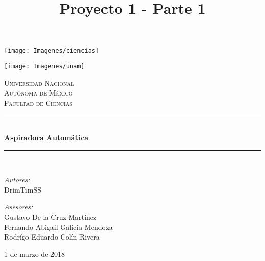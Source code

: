 \documentclass[11pt]{article}
\title{Proyecto 1 - Parte 1}
\newcommand{\HRule}{\rule{\linewidth}{0.5mm}}
\begin{document}

    \begin{center}
        \begin{minipage}{0.48\textwidth} \begin{flushleft}
        \texttt{[image: Imagenes/ciencias]}
        \end{flushleft}\end{minipage}
        \begin{minipage}{0.48\textwidth} \begin{flushright}
        \texttt{[image: Imagenes/unam]}
        \end{flushright}\end{minipage}

        \vspace*{-1.5cm}

        \textsc{\huge Universidad Nacional \\Autónoma de México}\\[1.5cm]

        \textsc{\LARGE Facultad de Ciencias}\\[3cm]

        \vspace*{1.5cm}

        \HRule \\[0.7cm]
        {\huge \bfseries Aspiradora Automática}\\[0.4cm]
        \HRule \\[1.5cm]

        \vfill

        \begin{minipage}{0.46\textwidth}
            \begin{flushleft} \large
                \emph{Autores:}\\
			DrimTimSS
            \end{flushleft}
        \end{minipage}
        \begin{minipage}{0.52\textwidth}
            \vspace{-0.6cm}
            \begin{flushright} \large
                \emph{Asesores:} \\
                Gustavo De la Cruz Martínez\\
                Fernando Abigail Galicia Mendoza\\
                Rodrígo Eduardo Colín Rivera
            \end{flushright}
        \end{minipage}
        \vspace*{1cm}

        \vspace{2cm}
        \begin{center}
            {\large 1 de marzo de 2018}
        \end{center}                                                                        
    \end{center}

    \newpage                                                                        

    \tableofcontents 

    \newpage
\end{document}
